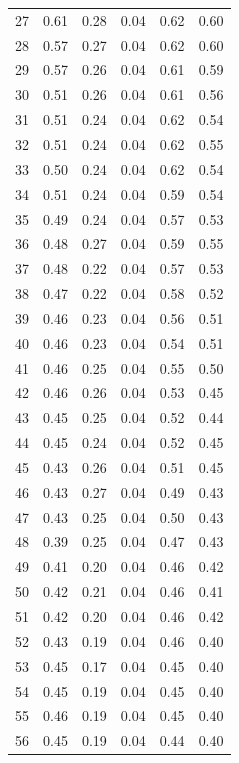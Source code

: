 \documentclass[a4paper, 12pt]{article}
\begin{document}
\begin{tabularx}{\linewidth}{|X|X|X|X|X|X|}
        27 & 0.61 & 0.28 & 0.04 & 0.62 & 0.60 \\
        28 & 0.57 & 0.27 & 0.04 & 0.62 & 0.60 \\
        29 & 0.57 & 0.26 & 0.04 & 0.61 & 0.59 \\
        30 & 0.51 & 0.26 & 0.04 & 0.61 & 0.56 \\
        31 & 0.51 & 0.24 & 0.04 & 0.62 & 0.54 \\
        32 & 0.51 & 0.24 & 0.04 & 0.62 & 0.55 \\
        33 & 0.50 & 0.24 & 0.04 & 0.62 & 0.54 \\
        34 & 0.51 & 0.24 & 0.04 & 0.59 & 0.54 \\
        35 & 0.49 & 0.24 & 0.04 & 0.57 & 0.53 \\
        36 & 0.48 & 0.27 & 0.04 & 0.59 & 0.55 \\
        37 & 0.48 & 0.22 & 0.04 & 0.57 & 0.53 \\
        38 & 0.47 & 0.22 & 0.04 & 0.58 & 0.52 \\
        39 & 0.46 & 0.23 & 0.04 & 0.56 & 0.51 \\
        40 & 0.46 & 0.23 & 0.04 & 0.54 & 0.51 \\
        41 & 0.46 & 0.25 & 0.04 & 0.55 & 0.50 \\
        42 & 0.46 & 0.26 & 0.04 & 0.53 & 0.45 \\
        43 & 0.45 & 0.25 & 0.04 & 0.52 & 0.44 \\
        44 & 0.45 & 0.24 & 0.04 & 0.52 & 0.45 \\
        45 & 0.43 & 0.26 & 0.04 & 0.51 & 0.45 \\
        46 & 0.43 & 0.27 & 0.04 & 0.49 & 0.43 \\
        47 & 0.43 & 0.25 & 0.04 & 0.50 & 0.43 \\
        48 & 0.39 & 0.25 & 0.04 & 0.47 & 0.43 \\
        49 & 0.41 & 0.20 & 0.04 & 0.46 & 0.42 \\
        50 & 0.42 & 0.21 & 0.04 & 0.46 & 0.41 \\
        51 & 0.42 & 0.20 & 0.04 & 0.46 & 0.42 \\
        52 & 0.43 & 0.19 & 0.04 & 0.46 & 0.40 \\
        53 & 0.45 & 0.17 & 0.04 & 0.45 & 0.40 \\
        54 & 0.45 & 0.19 & 0.04 & 0.45 & 0.40 \\
        55 & 0.46 & 0.19 & 0.04 & 0.45 & 0.40 \\
        56 & 0.45 & 0.19 & 0.04 & 0.44 & 0.40 \\

\end{tabularx}
\end{document}
